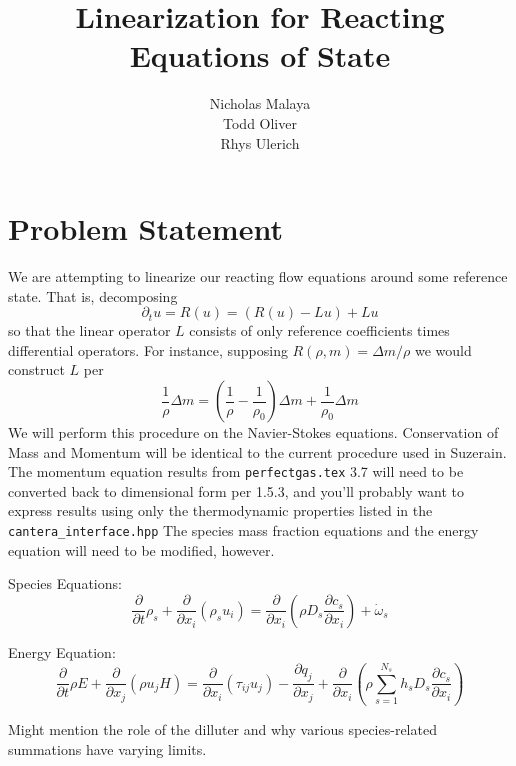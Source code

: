 \documentclass[10pt]{article}
\title{Linearization for Reacting Equations of State}
\author{Nicholas Malaya \\
        Todd Oliver \\
        Rhys Ulerich \\ }
\newcommand{\myred}[1]{{\color{red} #1}}
\begin{document}
\maketitle

\section{Problem Statement}

We are attempting to linearize our reacting flow equations around some
reference state.  That is, decomposing
\begin{equation}
\partial_t u = R(u) = \left(R(u) - Lu\right) + Lu
\end{equation}
so that the linear operator $L$ consists of only reference coefficients times
differential operators.  For instance, supposing $R(\rho, m) = \Delta m / \rho$
we would construct $L$ per
\begin{equation}
 \frac{1}{\rho}\Delta m = (\frac{1}{\rho}-\frac{1}{\rho_0})\Delta m +
  \frac{1}{\rho_0}\Delta m
\end{equation}
We will perform this procedure on the Navier-Stokes equations. Conservation of
Mass and Momentum will be identical to the current procedure used in Suzerain.
\myred{The momentum equation results from \texttt{perfectgas.tex}
\textsection{}3.7 will need to be converted back to dimensional form per
\textsection{}1.5.3, and you'll probably want to express results using only the
thermodynamic properties listed in the \texttt{cantera\_interface.hpp}} The
species mass fraction equations and the energy equation will need to be
modified, however.

Species Equations:
\begin{equation}
 \frac{\partial}{\partial t} \rho_s + \frac{\partial}{\partial
  x_i}\left(\rho_s u_i\right) = \frac{\partial}{\partial x_i}\left(\rho D_s
  \frac{\partial c_s}{\partial x_i} \right) + \dot \omega_s
\end{equation}

Energy Equation:
\begin{equation}
\frac{\partial}{\partial t} \rho E + \frac{\partial }{\partial x_j}\left(\rho
u_j H\right) = \frac{\partial }{\partial x_i}\left(\tau_{ij}u_j\right) - \frac{\partial q_j
}{\partial x_j} + \frac{\partial }{\partial x_i}\left(\rho \sum^{N_s}_{s=1}
h_s D_s \frac{\partial c_s}{\partial x_i} \right)
\end{equation}

\myred{Might mention the role of the dilluter and why various species-related
summations have varying limits}.
\end{document}
